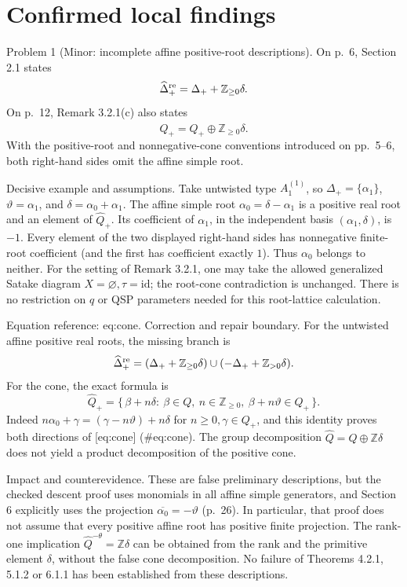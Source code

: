 \documentclass[10pt]{article}
\begin{document}
\section*{Confirmed local findings}
Problem 1 (Minor: incomplete affine positive-root descriptions).  On p. 6, Section 2.1 states \[\widehat\Delta^{\rm re}_+=\Delta_++\mathbb Z_{\ge0}\delta.\] On p. 12, Remark 3.2.1(c) also states \[\widehat Q_+=Q_+\oplus\mathbb Z_{\ge0}\delta.\] With the positive-root and nonnegative-cone conventions introduced on pp. 5–6, both right-hand sides omit the affine simple root.\par
Decisive example and assumptions. Take untwisted type \(A_1^{(1)}\), so \(\Delta_+=\{\alpha_1\}\), \(\vartheta=\alpha_1\), and \(\delta=\alpha_0+\alpha_1\). The affine simple root \(\alpha_0=\delta-\alpha_1\) is a positive real root and an element of \(\widehat Q_+\). Its coefficient of \(\alpha_1\), in the independent basis \((\alpha_1,\delta)\), is \(-1\). Every element of the two displayed right-hand sides has nonnegative finite-root coefficient (and the first has coefficient exactly \(1\)). Thus \(\alpha_0\) belongs to neither. For the setting of Remark 3.2.1, one may take the allowed generalized Satake diagram \(X=\varnothing,\tau=\mathrm{id}\); the root-cone contradiction is unchanged. There is no restriction on \(q\) or QSP parameters needed for this root-lattice calculation.\par
Equation reference: eq:cone. Correction and repair boundary. For the untwisted affine positive real roots, the missing branch is \[\widehat\Delta^{\rm re}_+
 =(\Delta_++\mathbb Z_{\ge0}\delta)
   \cup(-\Delta_++\mathbb Z_{>0}\delta).\] For the cone, the exact formula is \[\widehat Q_+
 =\{\,\beta+n\delta:\ \beta\in Q,\ n\in\mathbb Z_{\ge0},\
       \beta+n\vartheta\in Q_+\,\}.
 \] Indeed \(n\alpha_0+\gamma=(\gamma-n\vartheta)+n\delta\) for \(n\ge0,\gamma\in Q_+\), and this identity proves both directions of [eq:cone] (\#eq:cone). The group decomposition \(\widehat Q=Q\oplus\mathbb Z\delta\) does not yield a product decomposition of the positive cone.\par
Impact and counterevidence. These are false preliminary descriptions, but the checked descent proof uses monomials in all affine simple generators, and Section 6 explicitly uses the projection \(\overline{\alpha_0}=-\vartheta\) (p. 26). In particular, that proof does not assume that every positive affine root has positive finite projection. The rank-one implication \(\widehat Q^{-\theta}=\mathbb Z\delta\) can be obtained from the rank and the primitive element \(\delta\), without the false cone decomposition. No failure of Theorems 4.2.1, 5.1.2 or 6.1.1 has been established from these descriptions.\par
\end{document}
